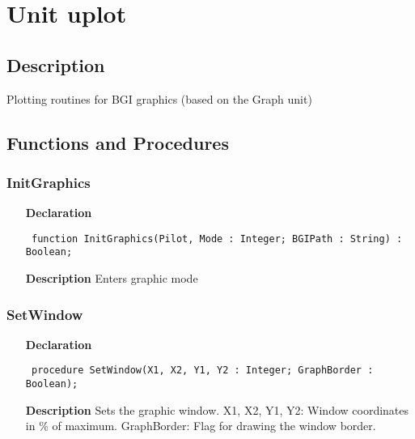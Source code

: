 \documentclass[12pt,a4paper,oneside]{report}
\newcommand{\declarationitem}[1]{\textbf{#1}}
\newcommand{\descriptiontitle}[1]{\textbf{#1}}
\newcommand{\code}[1]{\texttt{#1}}
\begin{document}
\section{Unit uplot}
\label{uplot}
\subsection{Description}
Plotting routines for BGI graphics (based on the Graph unit) 
\subsection{Functions and Procedures}
\subsubsection{InitGraphics}
\label{uplot-InitGraphics}
\begin{itemize}\item[\declarationitem{Declaration}\hfill]
	\begin{flushleft}
		\code{
			function InitGraphics(Pilot, Mode : Integer; BGIPath : String) : Boolean;}
		
	\end{flushleft}
	
	\par
	\item[\descriptiontitle{Description}]
	Enters graphic mode
\end{itemize}
\subsubsection{SetWindow}
\label{uplot-SetWindow}
\begin{itemize}\item[\declarationitem{Declaration}\hfill]
	\begin{flushleft}
		\code{
			procedure SetWindow(X1, X2, Y1, Y2 : Integer; GraphBorder : Boolean);}
		
	\end{flushleft}
	
	\par
	\item[\descriptiontitle{Description}]
	Sets the graphic window. X1, X2, Y1, Y2: Window coordinates in {\%} of maximum. GraphBorder: Flag for drawing the window border.
	
\end{itemize}
\end{document}
